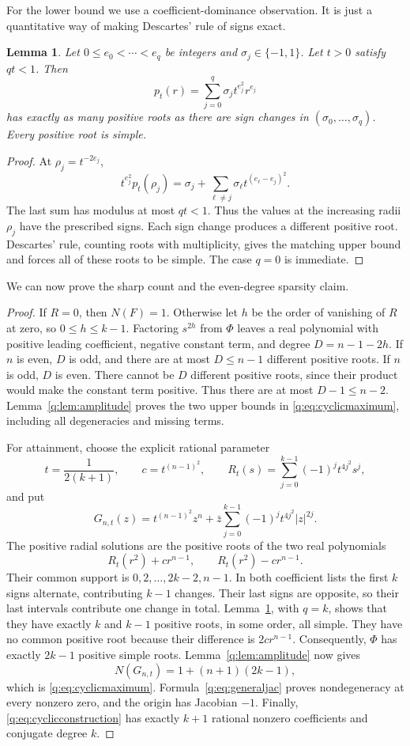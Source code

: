 \documentclass[UTF8,11pt]{ctexart}
\newtheorem{lem}[thm]{Lemma}
\theoremstyle{definition}
\numberwithin{equation}{section}
\begin{document}
For the lower bound we use a coefficient-dominance observation. It is
just a quantitative way of making Descartes' rule of signs exact.
\begin{lem}\label{q:lem:dominance}
Let $0\le e_0<\cdots<e_q$ be integers and
$\sigma_j\in\{-1,1\}$. Let $t>0$ satisfy $qt<1$. Then
\[
 p_t(r)=\sum_{j=0}^q\sigma_jt^{e_j^2}r^{e_j}
\]
has exactly as many positive roots as there are sign changes in
$(\sigma_0,\ldots,\sigma_q)$. Every positive root is simple.
\end{lem}
\begin{proof}
At $\rho_j=t^{-2e_j}$,
\[
 t^{e_j^2}p_t(\rho_j)=\sigma_j+
 \sum_{\ell\ne j}\sigma_\ell t^{(e_\ell-e_j)^2}.
\]
The last sum has modulus at most $qt<1$. Thus the values at the
increasing radii $\rho_j$ have the prescribed signs. Each sign change
produces a different positive root. Descartes' rule, counting roots
with multiplicity, gives the matching upper bound and forces all of
these roots to be simple. The case $q=0$ is immediate.
\end{proof}

We can now prove the sharp count and the even-degree sparsity claim.
\begin{proof}
If $R=0$, then $N(F)=1$. Otherwise let $h$ be the order of vanishing of
$R$ at zero, so $0\le h\le k-1$. Factoring $s^{2h}$ from $\Phi$ leaves
a real polynomial with positive leading coefficient, negative constant
term, and degree $D=n-1-2h$.
If $n$ is even, $D$ is odd, and there are at most $D\le n-1$
different positive roots. If $n$ is odd, $D$ is even. There cannot be
$D$ different positive roots, since their product would make the constant
term positive. Thus there are at most $D-1\le n-2$.
Lemma~\ref{q:lem:amplitude} proves the two upper bounds in
\eqref{q:eq:cyclicmaximum}, including all degeneracies and missing terms.

For attainment, choose the explicit rational parameter
\[
 t=\frac1{2(k+1)},\qquad c=t^{(n-1)^2},\qquad
 R_t(s)=\sum_{j=0}^{k-1}(-1)^jt^{4j^2}s^j,
\]
and put
\begin{equation}\label{q:eq:cyclicconstruction}
 G_{n,t}(z)=t^{(n-1)^2}z^n+
             \bar z\sum_{j=0}^{k-1}(-1)^jt^{4j^2}|z|^{2j}.
\end{equation}
The positive radial solutions are the positive roots of the two real
polynomials
\[
 R_t(r^2)+cr^{n-1},\qquad R_t(r^2)-cr^{n-1}.
\]
Their common support is $0,2,\ldots,2k-2,n-1$. In both coefficient
lists the first $k$ signs alternate, contributing $k-1$ changes. Their
last signs are opposite, so their last intervals contribute one change
in total. Lemma~\ref{q:lem:dominance}, with $q=k$, shows that they have
exactly $k$ and $k-1$ positive roots, in some order, all simple. They
have no common positive root because their difference is $2cr^{n-1}$.
Consequently, $\Phi$ has exactly $2k-1$ positive simple roots.
Lemma~\ref{q:lem:amplitude} now gives
\[
 N(G_{n,t})=1+(n+1)(2k-1),
\]
which is \eqref{q:eq:cyclicmaximum}. Formula~\eqref{q:eq:generaljac} proves
nondegeneracy at every nonzero zero, and the origin has Jacobian $-1$.
Finally, \eqref{q:eq:cyclicconstruction} has exactly $k+1$ rational
nonzero coefficients and conjugate degree $k$.
\end{proof}
\end{document}

